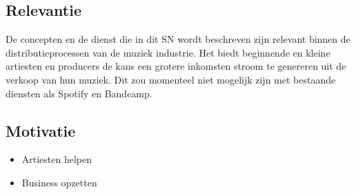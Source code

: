 \subsection{Relevantie}
De concepten en de dienst die in dit SN wordt beschreven zijn relevant binnen de distributieprocessen van de muziek industrie. Het biedt beginnende en kleine artiesten en producers de kans een grotere inkomsten stroom te genereren uit de verkoop van hun muziek. Dit zou momenteel niet mogelijk zijn met bestaande diensten als Spotify en Bandcamp.

\subsection{Motivatie}
\begin{itemize}
    \item Artiesten helpen
    \item Business opzetten
\end{itemize}
